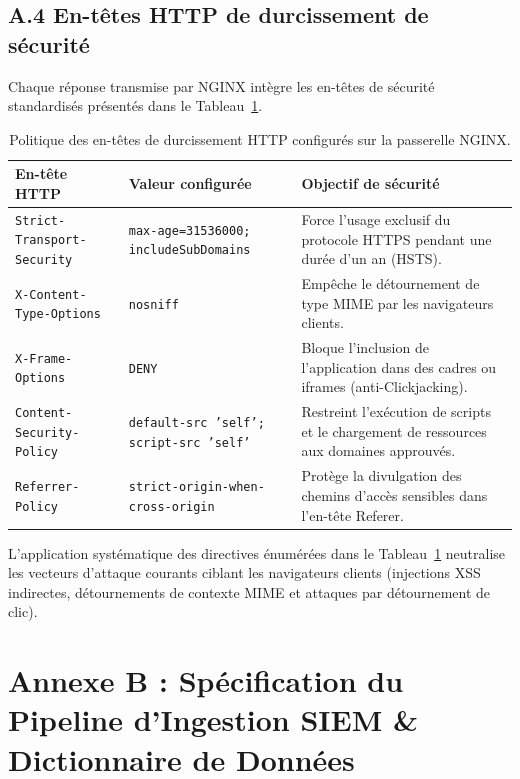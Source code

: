 \subsection*{A.4 En-têtes HTTP de durcissement de sécurité}
Chaque réponse transmise par NGINX intègre les en-têtes de sécurité standardisés présentés dans le Tableau~\ref{tab:annexe_headers}.

\begin{table}[!htbp]
\centering
\footnotesize
\begin{tabular}{|>{\raggedright\arraybackslash}p{3.8cm}|>{\raggedright\arraybackslash}p{5.0cm}|>{\raggedright\arraybackslash}p{5.2cm}|}
\hline
\textbf{En-tête HTTP} & \textbf{Valeur configurée} & \textbf{Objectif de sécurité} \\ \hline
\texttt{Strict-Transport-Security} & \texttt{max-age=31536000;} \newline \texttt{includeSubDomains} & Force l'usage exclusif du protocole HTTPS pendant une durée d'un an (HSTS). \\ \hline
\texttt{X-Content-Type-Options} & \texttt{nosniff} & Empêche le détournement de type MIME par les navigateurs clients. \\ \hline
\texttt{X-Frame-Options} & \texttt{DENY} & Bloque l'inclusion de l'application dans des cadres ou iframes (anti-Clickjacking). \\ \hline
\texttt{Content-Security-Policy} & \texttt{default-src 'self';} \newline \texttt{script-src 'self'} & Restreint l'exécution de scripts et le chargement de ressources aux domaines approuvés. \\ \hline
\texttt{Referrer-Policy} & \texttt{strict-origin-when-cross-origin} & Protège la divulgation des chemins d'accès sensibles dans l'en-tête Referer. \\ \hline
\end{tabular}
\caption{Politique des en-têtes de durcissement HTTP configurés sur la passerelle NGINX.}
\label{tab:annexe_headers}
\end{table}

L'application systématique des directives énumérées dans le Tableau~\ref{tab:annexe_headers} neutralise les vecteurs d'attaque courants ciblant les navigateurs clients (injections XSS indirectes, détournements de contexte MIME et attaques par détournement de clic).

\clearpage
\section*{Annexe B : Spécification du Pipeline d'Ingestion SIEM \& Dictionnaire de Données}

